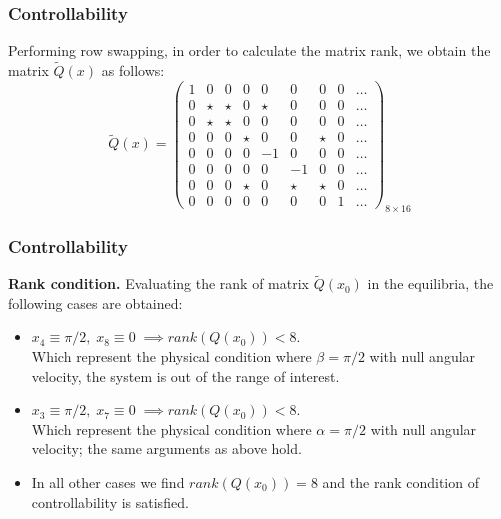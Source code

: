 \begin{frame}
\frametitle{Controllability}
Performing row swapping, in order to calculate the matrix rank, we obtain the matrix
$\tilde{Q}(x)$ as follows:\\[10pt]
\begin{equation}
	\tilde{Q}(x)=%
	\begin{pmatrix}
		1 &0     &0     &0     &0     &0     &0     &0 &\dots \\
		0 &\star &\star &0     &\star &0     &0     &0 &\dots \\
		0 &\star &\star &0     &0     &0     &0     &0 &\dots \\
		0 &0     &0     &\star &0     &0     &\star &0 &\dots \\
		0 &0     &0     &0     &-1    &0     &0     &0 &\dots \\
		0 &0     &0     &0     &0     &-1    &0     &0 &\dots \\
		0 &0     &0     &\star &0     &\star &\star &0 &\dots \\
		0 &0     &0     &0     &0     &0     &0     &1 &\dots
	\end{pmatrix}_{8\times16}
\end{equation}
\end{frame}
%
\begin{frame}
\frametitle{Controllability}
\textbf{Rank condition.} Evaluating the rank of matrix $\tilde{Q}(x_0)$ in the equilibria, the following cases are obtained:
\begin{itemize}
	\item $x_4 \equiv \pi/2,\; x_8 \equiv 0\; \implies rank(Q(x_0))<8$.\\ Which represent the physical condition where $\beta = \pi/2$ with null angular velocity, the system is out of the range of interest.
	\item $x_3 \equiv \pi/2,\; x_7 \equiv 0\; \implies rank(Q(x_0))<8$.\\ Which represent the physical condition where $\alpha = \pi/2$ with null angular velocity; the same arguments as above hold.
	\item In all other cases we find $rank(Q(x_0))=8$ and the rank condition of controllability is satisfied.
\end{itemize}
\end{frame}
%
